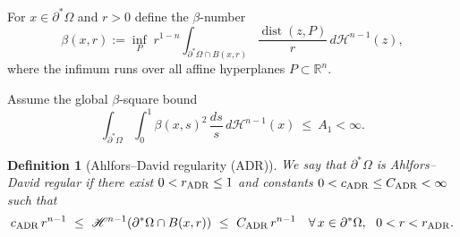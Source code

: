 \documentclass[reqno,11pt]{amsart}
\makeatletter
\def\dist{{\mathop\mathrm{dist}}}
\newtheorem{defn}[thm]{Definition}%
\numberwithin{equation}{section}
\theoremstyle{remark}
\makeatother
\begin{document}
For $x\in\partial^*\Omega$ and $r>0$ define the $\beta$-number
\begin{equation}\label{def:beta}
  \beta(x,r):=\inf_{P}\; r^{1-n}\!\!\int_{\partial^*\Omega\cap B(x,r)} \frac{\dist(z,P)}{r}\,d\mathscr H^{n-1}(z),
\end{equation}
where the infimum runs over all affine hyperplanes $P\subset\mathbb R^n$.

Assume the global $\beta$-square bound
\begin{equation}\label{ass:A1}
  \int_{\partial^*\Omega}\int_0^1 \beta(x,s)^2\,\frac{ds}{s}\,d\mathscr H^{n-1}(x)\ \le\ A_1<\infty.
\end{equation}

\begin{defn}[Ahlfors--David regularity (ADR)]\label{def:ADR}
We say that $\partial^*\Omega$ is \emph{Ahlfors--David regular} if there exist $0<r_{\rm ADR}\le 1$ and constants
$0<c_{\rm ADR}\le C_{\rm ADR}<\infty$ such that
\begin{equation}\label{eq:ADR}
  c_{\rm ADR}\,r^{n-1}\ \le\ \mathscr H^{n-1}(\partial^*\Omega\cap B(x,r))\ \le\ C_{\rm ADR}\,r^{n-1}
  \quad \forall\,x\in\partial^*\Omega,\ \ 0<r<r_{\rm ADR}.
\end{equation}
\end{defn}
\end{document}
